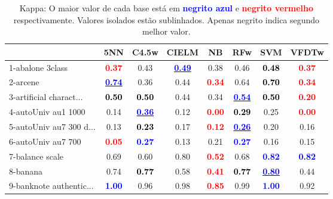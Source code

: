 \begin{table}[h]
\caption{Kappa: O maior valor de cada base está em \textcolor{blue}{\textbf{negrito azul}} e \textcolor{red}{\textbf{negrito vermelho}} respectivamente. Valores isolados estão sublinhados. Apenas negrito indica segundo melhor valor.}
\begin{center}\begin{tabular}{lc|c|c|c|c|c|c}
 & 5NN & C4.5w & CIELM & NB & RFw & SVM & VFDTw\\ \hline 1-abalone 3class & \textcolor{red}{\textbf{  0.37}} &   0.43 & \underline{\textcolor{blue}{\textbf{  0.49}}} &   0.38 &   0.46 & \textcolor{black}{\textbf{  0.48}} & \textcolor{red}{\textbf{  0.37}} \\
2-arcene & \underline{\textcolor{blue}{\textbf{  0.74}}} &   0.36 &   0.44 & \textcolor{red}{\textbf{  0.34}} &   0.64 & \textcolor{black}{\textbf{  0.70}} & \textcolor{red}{\textbf{  0.34}} \\
3-artificial charact... & \textcolor{black}{\textbf{  0.50}} & \textcolor{black}{\textbf{  0.50}} &   0.44 &   0.34 & \underline{\textcolor{blue}{\textbf{  0.54}}} & \textcolor{black}{\textbf{  0.50}} & \textcolor{red}{\textbf{  0.20}} \\
4-autoUniv au1 1000 &   0.14 & \underline{\textcolor{blue}{\textbf{  0.36}}} &   0.12 & \textcolor{red}{\textbf{  0.00}} & \textcolor{black}{\textbf{  0.29}} &   0.25 & \textcolor{red}{\textbf{  0.00}} \\
5-autoUniv au7 300 d... &   0.13 & \textcolor{black}{\textbf{  0.23}} &   0.17 & \textcolor{red}{\textbf{  0.12}} & \underline{\textcolor{blue}{\textbf{  0.26}}} &   0.20 &   0.16 \\ \hline
6-autoUniv au7 700 & \textcolor{red}{\textbf{  0.05}} & \textcolor{blue}{\textbf{  0.27}} &   0.13 &   0.21 & \textcolor{blue}{\textbf{  0.27}} &   0.16 &   0.15 \\
7-balance scale &   0.69 &   0.60 &   0.80 & \textcolor{red}{\textbf{  0.52}} &   0.68 & \textcolor{blue}{\textbf{  0.82}} & \textcolor{blue}{\textbf{  0.82}} \\
8-banana &   0.74 & \textcolor{black}{\textbf{  0.77}} &   0.58 & \textcolor{red}{\textbf{  0.41}} & \textcolor{black}{\textbf{  0.77}} & \underline{\textcolor{blue}{\textbf{  0.80}}} &   0.44 \\
9-banknote authentic... & \textcolor{blue}{\textbf{  1.00}} &   0.96 &   0.98 & \textcolor{red}{\textbf{  0.85}} &   0.99 & \textcolor{blue}{\textbf{  1.00}} &   0.92 \\

\end{tabular}
\end{center}
\end{table}

